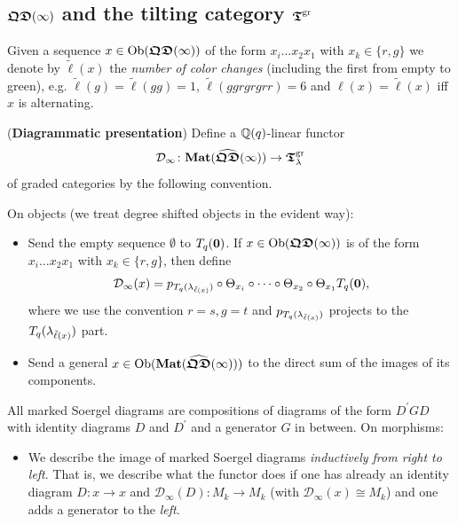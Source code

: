 \subsection{\texorpdfstring{$\boldsymbol{\mathfrak{QD}}(\infty)$}{QDinfty} and the tilting category \texorpdfstring{$\boldsymbol{\mathfrak{T}}^{\mathrm{gr}}$}{Tgr}}\label{sub-diatil}


Given a sequence $x\in\mathrm{Ob}(\boldsymbol{\mathfrak{QD}}(\infty))$ of the 
form $x_i\dots x_2x_1$ with $x_k\in\{r,g\}$ 
we denote by $\tilde{\ell}(x)$ the 
\textit{number of color changes} 
(including the first from empty to green), 
e.g. $\tilde{\ell}(g)=\tilde{\ell}(gg)=1$, 
$\tilde{\ell}(ggrgrgrr)=6$ and $\ell(x)=\tilde{\ell}(x)$ iff $x$ is alternating.



\begin{defn}(\textbf{Diagrammatic presentation})\label{defn-functor}
Define a $\mathbb{Q}(q)$-linear functor
\[
\mathcal{D}_{\infty}\colon \boldsymbol{\mathrm{Mat}}(\widehat{\boldsymbol{\mathfrak{QD}}}(\infty))\to\boldsymbol{\mathfrak{T}}_{\lambda}^{\mathrm{gr}}
\]
of graded categories by the following convention.



On objects (we treat degree 
shifted objects in the evident way):
\begin{itemize}
\item Send the empty sequence $\emptyset$ to $T_q({\boldsymbol{0}})$. If $x\in\mathrm{Ob}(\boldsymbol{\mathfrak{QD}}(\infty))$ is of the 
form $x_i\dots x_2x_1$ with $x_k\in\{r,g\}$, then define
\[
\mathcal{D}_{\infty}(x)=p_{T_q({\lambda_{\tilde{\ell}(x)}})}\circ\Theta_{x_i}\circ\dots\circ\Theta_{x_2}\circ\Theta_{x_1}T_q({\boldsymbol{0}}),
\]
where we use the convention 
$r=s, g=t$ and $p_{T_q({\lambda_{\tilde{\ell}(x)}})}$ projects 
to the $T_q({\lambda_{\tilde{\ell}(x)}})$ part.



\item Send a general $x\in\mathrm{Ob}(\boldsymbol{\mathrm{Mat}}(\widehat{\boldsymbol{\mathfrak{QD}}}(\infty)))$ to the direct sum of the images of its components.
\end{itemize}



All marked Soergel diagrams are 
compositions of diagrams of the form 
$D^{\prime}GD$ with identity diagrams 
$D$ and $D^{\prime}$ and a generator 
$G$ in between. On morphisms:
\begin{itemize}
\item We describe the image of marked Soergel 
diagrams \textit{inductively from right to left}. 
That is, we describe what the functor does if 
one has already an identity diagram 
$D\colon x\to x$ and $\mathcal{D}_{\infty}(D)\colon M_k\to M_k$ 
(with $\mathcal{D}_{\infty}(x)\cong M_k$) and one adds a generator to the \textit{left}.
 

\end{itemize}
\end{defn}
